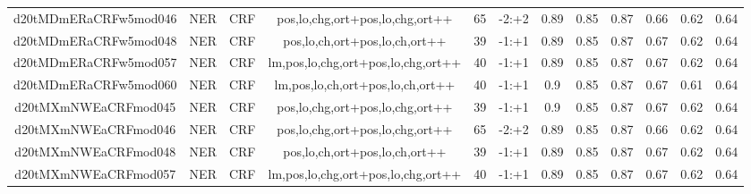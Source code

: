 \documentclass[a4paper]{article}
\begin{document}
\begin{landscape}
\begin{center}
\begin{tabular}{ |c|c|c|c|c|c|c|c|c|c|c|c|}
 	
 
 	
 		
 		\small{ d20tMDmERaCRFw5mod046 } & NER & CRF & pos,lo,chg,ort+pos,lo,chg,ort++  &  65 &  -2:+2  &  0.89 & 0.85 & 0.87  &  0.66 & 0.62 & 0.64 \\
 		

 	
 
 	
 		
 		\small{ d20tMDmERaCRFw5mod048 } & NER & CRF & pos,lo,ch,ort+pos,lo,ch,ort++  &  39 &  -1:+1  &  0.89 & 0.85 & 0.87  &  0.67 & 0.62 & 0.64 \\
 		

 	
 
 	
 		
 		\small{ d20tMDmERaCRFw5mod057 } & NER & CRF & lm,pos,lo,chg,ort+pos,lo,chg,ort++  &  40 &  -1:+1  &  0.89 & 0.85 & 0.87  &  0.67 & 0.62 & 0.64 \\
 		

 	
 
 	
 		
 		\small{ d20tMDmERaCRFw5mod060 } & NER & CRF & lm,pos,lo,ch,ort+pos,lo,ch,ort++  &  40 &  -1:+1  &  0.9 & 0.85 & 0.87  &  0.67 & 0.61 & 0.64 \\
 		

 	
 
 	
 		
 		\small{ d20tMXmNWEaCRFmod045 } & NER & CRF & pos,lo,chg,ort+pos,lo,chg,ort++  &  39 &  -1:+1  &  0.9 & 0.85 & 0.87  &  0.67 & 0.62 & 0.64 \\
 		

 	
 
 	
 		
 		\small{ d20tMXmNWEaCRFmod046 } & NER & CRF & pos,lo,chg,ort+pos,lo,chg,ort++  &  65 &  -2:+2  &  0.89 & 0.85 & 0.87  &  0.66 & 0.62 & 0.64 \\
 		

 	
 
 	
 		
 		\small{ d20tMXmNWEaCRFmod048 } & NER & CRF & pos,lo,ch,ort+pos,lo,ch,ort++  &  39 &  -1:+1  &  0.89 & 0.85 & 0.87  &  0.67 & 0.62 & 0.64 \\
 		

 	
 
 	
 		
 		\small{ d20tMXmNWEaCRFmod057 } & NER & CRF & lm,pos,lo,chg,ort+pos,lo,chg,ort++  &  40 &  -1:+1  &  0.89 & 0.85 & 0.87  &  0.67 & 0.62 & 0.64 \\
 		

 	
 

\end{tabular}
\end{center}
\end{landscape}
\end{document}
